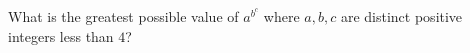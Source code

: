 What is the greatest possible value of $a^{b^c}$ where $a,b,c$ are distinct positive integers less than $4$?
